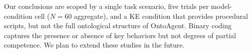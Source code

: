 \documentclass[letterpaper, 10 pt, conference]{ieeeconf}  %
\begin{document}
Our conclusions are scoped by a single task scenario, 
five trials per model-condition cell ($N{=}60$ aggregate), 
and a KE condition that provides procedural scripts, but 
not the full ontological structure of OntoAgent. Binary coding captures the presence or absence of key behaviors but not degrees of partial competence. We plan to extend these studies in the future.





\end{document}
